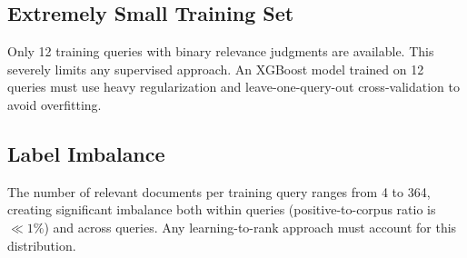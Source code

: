 \subsection{Extremely Small Training Set}
Only 12 training queries with binary relevance judgments are available. This severely limits any supervised approach. An XGBoost model trained on 12 queries must use heavy regularization and leave-one-query-out cross-validation to avoid overfitting.

\subsection{Label Imbalance}
The number of relevant documents per training query ranges from 4 to 364, creating significant imbalance both within queries (positive-to-corpus ratio is $\ll 1\%$) and across queries. Any learning-to-rank approach must account for this distribution.
